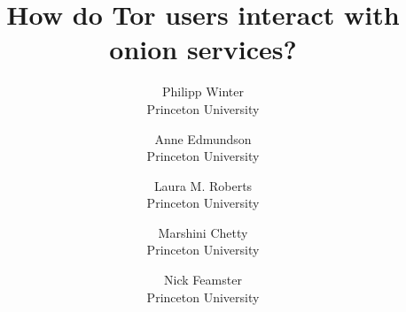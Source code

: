 \documentclass[letterpaper,twocolumn,10pt]{article}
\begin{document}
\date{}

\title{
    {\Large \textbf{How do Tor users interact with onion services?}}
}

\author{
	{\rm Philipp Winter} \\
	Princeton University
	\and
	{\rm Anne Edmundson} \\
	Princeton University
	\and
	{\rm Laura M. Roberts} \\
	Princeton University
	\and
	{\rm Marshini Chetty} \\
	Princeton University
	\and
	{\rm Nick Feamster} \\
	Princeton University
}

\maketitle

\thispagestyle{empty}



















{\footnotesize
\printbibliography}


\end{document}
